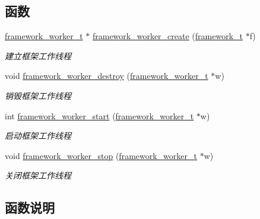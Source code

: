 \subsection*{函数}
\begin{DoxyCompactItemize}
\item 
\hyperlink{a00047_aeb7a44e6b579659a8aae81f3ab819af3_aeb7a44e6b579659a8aae81f3ab819af3}{framework\+\_\+worker\+\_\+t} $\ast$ \hyperlink{a00053_a0617a9e873aa183a3bb0cc33a542a8a1_a0617a9e873aa183a3bb0cc33a542a8a1}{framework\+\_\+worker\+\_\+create} (\hyperlink{a00047_a6149d769f6f07ed14a40a271c95d8463_a6149d769f6f07ed14a40a271c95d8463}{framework\+\_\+t} $\ast$f)
\begin{DoxyCompactList}\small\item\em 建立框架工作线程 \end{DoxyCompactList}\item 
void \hyperlink{a00053_a1f5d04499db3c8137c840c8c87cdba5e_a1f5d04499db3c8137c840c8c87cdba5e}{framework\+\_\+worker\+\_\+destroy} (\hyperlink{a00047_aeb7a44e6b579659a8aae81f3ab819af3_aeb7a44e6b579659a8aae81f3ab819af3}{framework\+\_\+worker\+\_\+t} $\ast$w)
\begin{DoxyCompactList}\small\item\em 销毁框架工作线程 \end{DoxyCompactList}\item 
int \hyperlink{a00053_a8030b85e272bfe80459bbecbca5cd9c0_a8030b85e272bfe80459bbecbca5cd9c0}{framework\+\_\+worker\+\_\+start} (\hyperlink{a00047_aeb7a44e6b579659a8aae81f3ab819af3_aeb7a44e6b579659a8aae81f3ab819af3}{framework\+\_\+worker\+\_\+t} $\ast$w)
\begin{DoxyCompactList}\small\item\em 启动框架工作线程 \end{DoxyCompactList}\item 
void \hyperlink{a00053_a52ecf94ed22881622a06600042ab1bb1_a52ecf94ed22881622a06600042ab1bb1}{framework\+\_\+worker\+\_\+stop} (\hyperlink{a00047_aeb7a44e6b579659a8aae81f3ab819af3_aeb7a44e6b579659a8aae81f3ab819af3}{framework\+\_\+worker\+\_\+t} $\ast$w)
\begin{DoxyCompactList}\small\item\em 关闭框架工作线程 \end{DoxyCompactList}\end{DoxyCompactItemize}


\subsection{函数说明}
\hypertarget{a00053_a0617a9e873aa183a3bb0cc33a542a8a1_a0617a9e873aa183a3bb0cc33a542a8a1}{}
